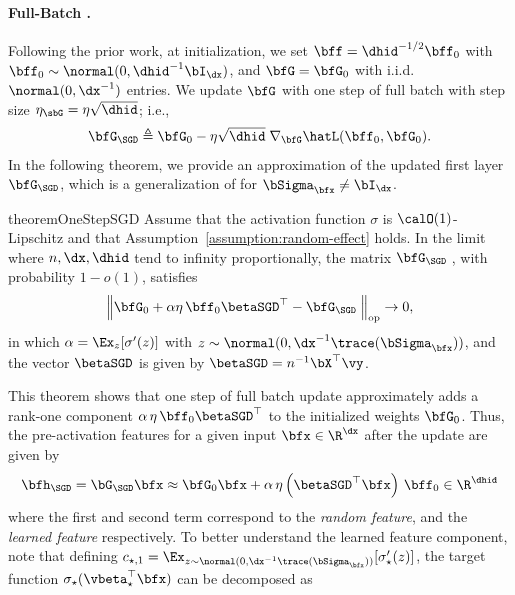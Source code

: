 \paragraph{Full-Batch \SGD.} Following the prior work, at initialization, we set $ \bff = \dhid^{-1/2} \bff_0$ with $\bff_0 \sim \normal(0, \dhid^{-1}\bI_{\dx})$, and  $\bfG= \bfG_0$ with i.i.d. $\normal(0, \dx^{-1})$ entries. We update $\bfG$ with one step of full batch \SGD  with step size $\eta_{\sbG} = \eta \sqrt{\dhid}$; i.e.,
\begin{align*}
    \bfG_{\SGD } \triangleq \bfG_0  - \eta \sqrt{\dhid} \; \nabla_\bfG \hatL(\bff_0, \bfG_0).
\end{align*}
In the following theorem, we provide an approximation of the updated first layer $\bfG_{\SGD }$, which is a generalization of \citep[
Proposition 2.1]{ba2022high} for $\bSigma_\bfx \neq \bI_{\dx}$.
\begin{restatable}{theorem}{OneStepSGD}
    \label{thm:rank1}
    Assume that the activation function $\sigma$ is $\calO(1)$-Lipschitz and that Assumption~\ref{assumption:random-effect} holds. In the limit where $n, \dx, \dhid$ tend to infinity proportionally, 
    the matrix $\bfG_{\textup{\SGD }}$, with probability $1 - o(1)$, satisfies
    \begin{align*}
        \left\|\bfG_0 + {\alpha \eta}\, \bff_0 \betaSGD^\top - \bfG_{\textup{\SGD }}\right\|_{\rm op} \to 0,
    \end{align*}
    in which $\alpha = \Ex_{z}[\sigma'(z)]$ with $z \sim \normal(0,\dx^{-1}\trace(\bSigma_\bfx))$, and the vector $\betaSGD$ is given by $\betaSGD = n^{-1} \bX^\top \vy$.
\end{restatable}
This theorem shows that one step of full batch \SGD  update approximately adds a rank-one component $\alpha\, \eta \, \bff_0 \betaSGD^\top$ to the initialized weights $\bfG_0$. Thus, the pre-activation features for a given input $\bfx \in \R^{\dx}$ after the update are given by
\begin{align*}
    \bfh_{\SGD } = \bG_{\SGD}\bfx \approx \bfG_0 \bfx + \alpha\, \eta \left(\betaSGD^\top \bfx\right) \, \bff_0 \in \R^{\dhid}
\end{align*}
where the first and second term correspond to the \textit{random feature}, and the \textit{learned feature} respectively. 
To better understand the learned feature component, note that defining $c_{\star, 1} = \Ex_{z\sim\normal(0, \dx^{-1}\trace(\bSigma_\bfx))} [\sigma_{\star}'(z)]$,  the target function $\sigma_\star(\vbeta_\star^\top \bfx)$ can be decomposed as
